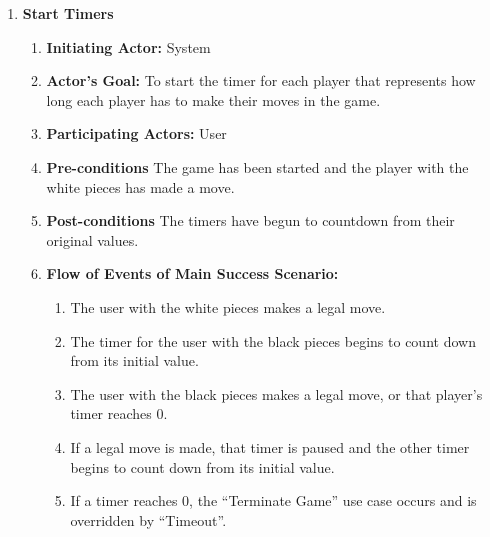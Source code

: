 \documentclass[12pt, titlepage]{article}
\begin{document}
\begin{enumerate}[{UC}1.]
                \item \textbf{Start Timers}
                    \begin{enumerate}[{ }]
                        \item \textbf{Initiating Actor:} 
                            System
            
                        \item \textbf{Actor's Goal:} 
                            To start the timer for each player that represents how long each player has to make their moves in the game.
                        
                        \item \textbf{Participating Actors:} 
                            User
                        
                        \item \textbf{Pre-conditions}
                            The game has been started and the player with the white pieces has made a move.
                            
                        \item \textbf{Post-conditions}
                            The timers have begun to countdown from their original values.
                            
                        \item \textbf{Flow of Events of Main Success Scenario:}
                           \begin{enumerate}
                                \item The user with the white pieces makes a legal move.
                                \item The timer for the user with the black pieces begins to count down from its initial value.
                                \item The user with the black pieces makes a legal move, or that player's timer reaches 0. 
                                \item If a legal move is made, that timer is paused and the other timer begins to count down from its initial value.
                                \item If a timer reaches 0, the ``Terminate Game'' use case occurs and is overridden by ``Timeout''.
                            \end{enumerate}
                    \end{enumerate}
            

\end{enumerate}
\end{document}
